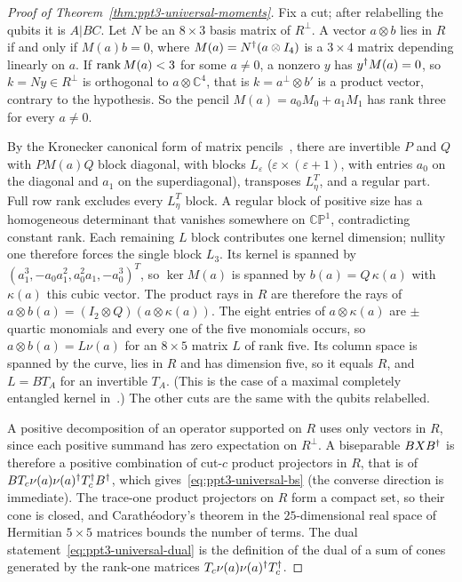 \begin{proof}[Proof of Theorem~\ref{thm:ppt3-universal-moments}]
Fix a cut; after relabelling the qubits it is $A|BC$. Let $N$ be an $8\times3$ basis matrix of $R^\perp$. A vector
$a\otimes b$ lies in $R$ if and only if $M(a)b=0$, where $M(a)=N^{\dagger}(a\otimes I_4)$ is a $3\times4$ matrix depending
linearly on $a$. If $\operatorname{rank} M(a)<3$ for some $a\ne0$, a nonzero $y$ has $y^{\dagger} M(a)=0$, so $k=Ny\in R^\perp$ is orthogonal
to $a\otimes\mathbb C^4$, that is $k=a^\perp\otimes b'$ is a product vector, contrary to the hypothesis. So the pencil
$M(a)=a_0M_0+a_1M_1$ has rank three for every $a\ne0$.

By the Kronecker canonical form of matrix pencils~\cite[Ch.~XII]{Gant}, there are invertible $P$ and $Q$ with
$PM(a)Q$ block diagonal, with blocks $L_\varepsilon$ ($\varepsilon\times(\varepsilon+1)$, with entries $a_0$ on the
diagonal and $a_1$ on the superdiagonal), transposes $L_\eta^T$, and a regular part. Full row rank excludes every
$L_\eta^T$ block. A regular block of positive size has a homogeneous determinant that vanishes somewhere on
$\mathbb{CP}^1$, contradicting constant rank. Each remaining $L$ block contributes one kernel dimension;
nullity one therefore forces the single block $L_3$. Its kernel is spanned by
$(a_1^3,-a_0a_1^2,a_0^2a_1,-a_0^3)^T$, so $\ker M(a)$ is spanned by $b(a)=Q\,\kappa(a)$ with $\kappa(a)$ this cubic vector.
The product rays in $R$ are therefore the rays of $a\otimes b(a)=(I_2\otimes Q)(a\otimes\kappa(a))$. The eight entries of
$a\otimes\kappa(a)$ are $\pm$ quartic monomials and every one of the five monomials occurs, so $a\otimes b(a)=L\nu(a)$ for
an $8\times5$ matrix $L$ of rank five. Its column space is spanned by the curve, lies in $R$ and has dimension five, so it
equals $R$, and $L=BT_A$ for an invertible $T_A$. (This is the case of a maximal completely entangled kernel
in~\cite[Prop.~24]{CD}.) The other cuts are the same with the qubits relabelled.

A positive decomposition of an operator supported on $R$ uses only vectors in $R$, since each positive summand has zero
expectation on $R^\perp$. A biseparable $BXB^{\dagger}$ is therefore a positive combination of cut-$c$ product projectors in
$R$, that is of $BT_c\nu(a)\nu(a)^{\dagger} T_c^{\dagger} B^{\dagger}$, which gives~\eqref{eq:ppt3-universal-bs} (the converse direction is
immediate). The trace-one product projectors on $R$ form a compact set, so their cone is closed, and Carath\'eodory's
theorem in the $25$-dimensional real space of Hermitian $5\times5$ matrices bounds the number of terms. The dual
statement~\eqref{eq:ppt3-universal-dual} is the definition of the dual of a sum of cones generated by the rank-one
matrices $T_c\nu(a)\nu(a)^{\dagger} T_c^{\dagger}$.
\end{proof}
